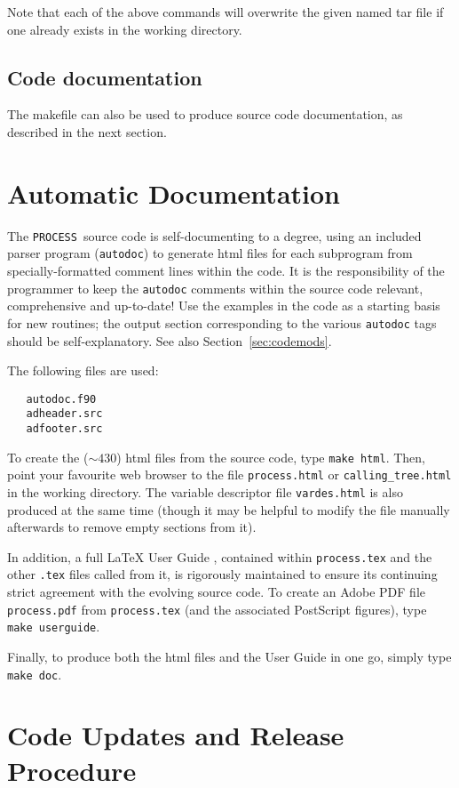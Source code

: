 \documentclass[11pt,a4paper]{report}
\newcommand{\process}{\mbox{\texttt{PROCESS}}}
\begin{document}
Note that each of the above commands will overwrite the given named tar file
if one already exists in the working directory.

\subsection{Code documentation}

The makefile can also be used to produce source code documentation, as
described in the next section.

\section{Automatic Documentation}
\label{sec:autodoc}

The \process\ source code is self-documenting to a degree, using an included
parser program (\texttt{autodoc}) to generate html files for each subprogram
from specially-formatted comment lines within the code. It is the
responsibility of the programmer to keep the \texttt{autodoc} comments within
the source code relevant, comprehensive and up-to-date! Use the examples in
the code as a starting basis for new routines; the output section
corresponding to the various \texttt{autodoc} tags should be
self-explanatory. See also Section~\ref{sec:codemods}.

The following files are used:
\begin{verbatim}
   autodoc.f90
   adheader.src
   adfooter.src
\end{verbatim}
To create the ($\sim 430$) html files from the source code, type
\verb+make html+.  Then, point your favourite web browser to the file
\texttt{process.html} or \texttt{calling\_tree.html} in the working
directory. The variable descriptor file \texttt{vardes.html} is also produced at the same time (though it may be
helpful to modify the file manually afterwards to remove empty sections from
it).

In addition, a full \LaTeX\/ User Guide , contained within
\texttt{process.tex} and the other \texttt{.tex} files called from it, is
rigorously maintained to ensure its continuing strict agreement with the
evolving source code. To create an Adobe PDF file \texttt{process.pdf} from
\texttt{process.tex} (and the associated PostScript figures), type
\verb+make userguide+.

Finally, to produce both the html files and the User Guide in one go, simply
type \verb+make doc+.

\section{Code Updates and Release Procedure}
\label{sec:code_release}
\end{document}
